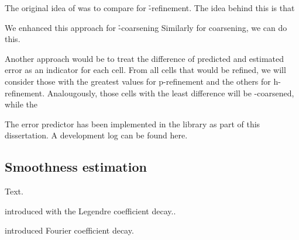 The original idea of \cite{melenk2001} was to compare  for \h-refinement.
The idea behind this is that

We enhanced this approach for \h-coarsening
Similarly for coarsening, we can do this.

Another approach would be to treat the difference of predicted and estimated error as an indicator for each cell. From all cells that would be refined, we will consider those with the greatest values for p-refinement and the others for h-refinement. Analougously, those cells with the least difference will be \p-coarsened, while the

The error predictor has been implemented in the \dealii library as part of this dissertation. A development log can be found here.



\subsection{Smoothness estimation}
\label{ssec:smoothness}

Text.

\cite{mavriplis1994} introduced with the Legendre coefficient decay..


\cite{bangerth2009} introduced Fourier coefficient decay.